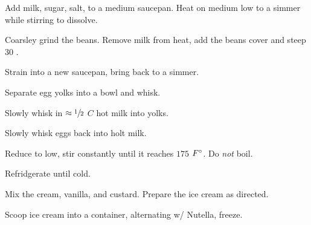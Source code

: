 \begin{preparation}
\item Add milk, sugar, salt, to a medium saucepan.
    Heat on medium low to a simmer while stirring to dissolve.
\item Coarsley grind the beans.
    Remove milk from heat, add the beans cover and steep 30 \minute.
\item Strain into a new saucepan, bring back to a simmer.
\item Separate egg yolks into a bowl and whisk.
\item Slowly whisk in $\approx\sfrac{1}{2}$ $C$ hot milk into yolks.
\item Slowly whisk eggs back into holt milk.
\item Reduce to low, stir constantly until it reaches $175$ $F^\circ$.
    Do \textit{not} boil.
\item Refridgerate until cold.
\item Mix the cream, vanilla, and custard.
    Prepare the ice cream as directed.
\item Scoop ice cream into a container, alternating w/ Nutella, freeze.
\end{preparation}

\recipeend%
